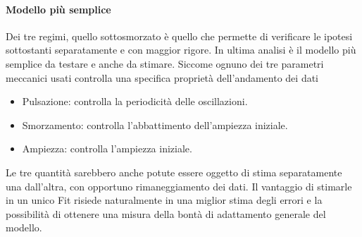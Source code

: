 \paragraph{Modello più semplice}
Dei tre regimi, quello sottosmorzato è quello che permette di verificare le ipotesi sottostanti separatamente e con maggior rigore. In ultima analisi è il modello più semplice da testare e anche da stimare. Siccome ognuno dei tre parametri meccanici usati controlla una specifica proprietà dell'andamento dei dati
\begin{itemize}
\item Pulsazione: controlla la periodicità delle oscillazioni.
\item Smorzamento: controlla l'abbattimento dell'ampiezza iniziale.
\item Ampiezza: controlla l'ampiezza iniziale.\\
\end{itemize}

Le tre quantità sarebbero anche potute essere oggetto di stima separatamente una dall'altra, con opportuno rimaneggiamento dei dati. Il vantaggio di stimarle in un unico Fit risiede naturalmente in una miglior stima degli errori e la possibilità di ottenere una misura della bontà di adattamento generale del modello.